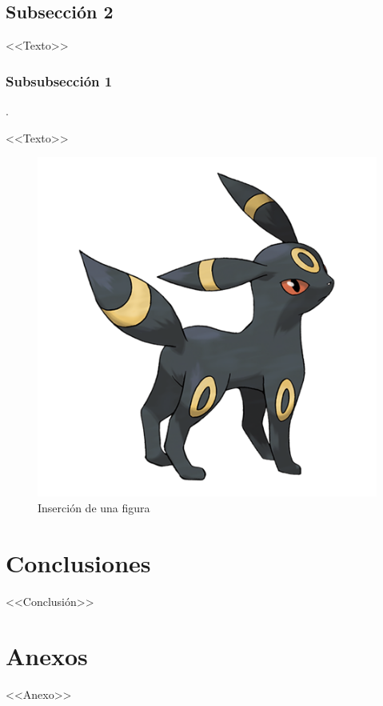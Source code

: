 \documentclass[letterpaper,11pt]{article}
\begin{document}
\begin{multicols}{2}

\subsection{Subsección 2}

<<Texto>>

\subsubsection{Subsubsección 1}.

<<Texto>>

\begin{figure}[H]
    \centering
    \includegraphics[scale=0.32]{pollito.png}
    \caption{Inserción de una figura}
    \label{figura}
\end{figure}

\section{Conclusiones}

<<Conclusión>>

\end{multicols}

\section{Anexos}

<<Anexo>>
\end{document}

